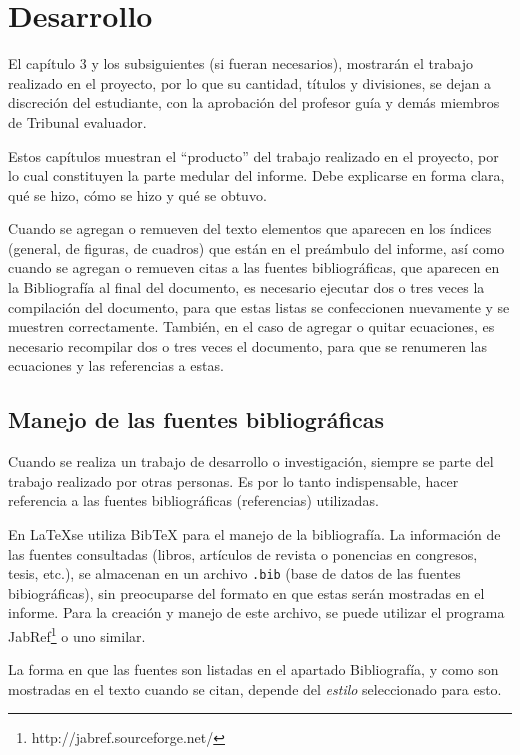 \chapter{Desarrollo}
El capítulo 3 y los subsiguientes (si fueran necesarios), mostrarán el trabajo realizado en el proyecto, por lo que su cantidad, títulos y divisiones, se dejan a discreción del estudiante, con la aprobación del profesor guía y demás miembros de Tribunal evaluador.

Estos capítulos muestran el ``producto'' del trabajo realizado en el proyecto, por lo cual constituyen la parte medular del informe. Debe explicarse en forma clara, qué se hizo, cómo se hizo y qué se obtuvo.

Cuando se agregan o remueven del texto elementos que aparecen en los índices (general, de figuras, de cuadros) que están en el preámbulo del informe, así como cuando se agregan o remueven citas a las fuentes bibliográficas, que aparecen en la Bibliografía al final del documento, es necesario ejecutar dos o tres veces la compilación del documento, para que estas listas se confeccionen nuevamente y se muestren correctamente.  También, en el caso de agregar o quitar ecuaciones, es necesario recompilar dos o tres veces el documento, para que se renumeren las ecuaciones y  las referencias a estas.

\section{Manejo de las fuentes bibliográficas}
Cuando se realiza un trabajo de desarrollo o investigación, siempre se parte del trabajo realizado por otras personas. Es por lo tanto indispensable, hacer referencia a las fuentes bibliográficas (referencias) utilizadas.

En \LaTeX se utiliza BibTeX para el manejo de la bibliografía.  La información de las fuentes consultadas (libros, artículos de revista o ponencias en congresos, tesis, etc.), se almacenan en un archivo \texttt{.bib} (base de datos de las fuentes bibiográficas), sin preocuparse del formato en que estas serán mostradas en el informe.  Para la creación y manejo de este archivo, se puede utilizar el programa JabRef\footnote{http://jabref.sourceforge.net/} o uno similar.

La forma en que las fuentes son listadas en el apartado Bibliografía, y como son mostradas en el texto cuando se citan, depende del \emph{estilo} seleccionado para esto.

